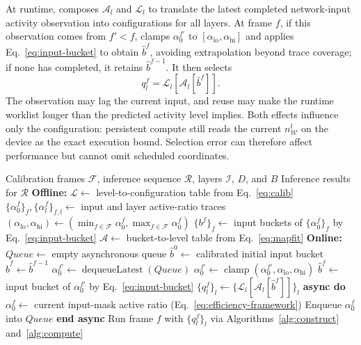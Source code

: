 At runtime, \sysname composes $\mathcal{A}_l$ and $\mathcal{L}_l$ to translate
the latest completed network-input activity observation into configurations for
all layers. At frame $f$, if this observation comes from $f'<f$, \sysname
clamps $\alpha_0^{f'}$ to $[\alpha_{\mathrm{lo}},\alpha_{\mathrm{hi}}]$ and
applies Eq.~\ref{eq:input-bucket} to obtain $\hat{b}^f$, avoiding extrapolation
beyond trace coverage; if none has completed, it retains $\hat{b}^{f-1}$. It
then selects
\begin{equation}
  q_l^f = \mathcal{L}_l\!\left[\mathcal{A}_l[\hat{b}^f]\right] .
  \label{eq:select}
\end{equation}
The observation may lag the current input, and reuse may make the runtime
worklist longer than the predicted activity level implies. Both effects
influence only the configuration: persistent compute still reads the current
$n^l_{\mathcal{W}}$ on the device as the exact execution bound. Selection
error can therefore affect performance but cannot omit scheduled coordinates.

\begin{algorithm}[htb]
\caption{Trace-Calibrated Nonblocking Configuration Selection}
\label{alg:adapt}
\begin{algorithmic}[1]
\REQUIRE Calibration frames $\mathcal{F}$, inference sequence $\mathcal{R}$,
         layers $\mathcal{I}$, $D$, and $B$
\ENSURE Inference results for $\mathcal{R}$
\STATE \textbf{Offline:}
\STATE $\mathcal{L} \leftarrow$ level-to-configuration table from
       Eq.~\ref{eq:calib}
\STATE $\{\alpha_0^f\}_f,\{\alpha_l^f\}_{f,l} \leftarrow$
       input and layer active-ratio traces
\STATE $(\alpha_{\mathrm{lo}},\alpha_{\mathrm{hi}}) \leftarrow
       (\min_{f\in\mathcal{F}}\alpha_0^f,
        \max_{f\in\mathcal{F}}\alpha_0^f)$
\STATE $\{b^f\}_f \leftarrow$ input buckets of $\{\alpha_0^f\}_f$ by
       Eq.~\ref{eq:input-bucket}
\STATE $\mathcal{A} \leftarrow$ bucket-to-level table from Eq.~\ref{eq:mapfit}
\STATE \textbf{Online:}
\STATE $\mathit{Queue} \leftarrow$ empty asynchronous queue
\STATE $\hat{b}^0 \leftarrow$ calibrated initial input bucket
  \STATE $\hat{b}^f \leftarrow \hat{b}^{f-1}$
    \STATE $\alpha_0^{f'} \leftarrow
           \operatorname{dequeueLatest}(\mathit{Queue})$
           \hfill{}
    \STATE $\alpha_0^{f'} \leftarrow
           \operatorname{clamp}(\alpha_0^{f'},
           \alpha_{\mathrm{lo}},\alpha_{\mathrm{hi}})$
    \STATE $\hat{b}^f \leftarrow$ input bucket of $\alpha_0^{f'}$ by
           Eq.~\ref{eq:input-bucket}
  \ENDIF
  \STATE $\{q_l^f\}_l \leftarrow
         \{\mathcal{L}_l[\mathcal{A}_l[\hat{b}^f]]\}_l$
  \STATE \textbf{async do}
  \STATE \hspace{1em}$\alpha_0^f \leftarrow$ current input-mask active ratio
         (Eq.~\ref{eq:efficiency-framework})
  \STATE \hspace{1em}Enqueue $\alpha_0^f$ into $\mathit{Queue}$
  \STATE \textbf{end async}
  \STATE Run frame $f$ with $\{q_l^f\}_l$ via
         Algorithms~\ref{alg:construct} and~\ref{alg:compute}
\ENDFOR
\end{algorithmic}
\end{algorithm}

